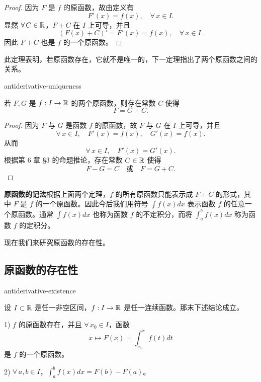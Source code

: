 \begin{proof}

	因为 \(F\) 是 \(f\) 的原函数，故由定义有
	\[
	F'(x)=f(x),\quad\forall\,x\in I.
	\]
	显然 \(\forall\,C\in\mathbb{R}\)，\(F+C\) 在 \(I\) 上可导，并且
	\[
	(F(x)+C)'=F'(x)=f(x),\quad\forall\,x\in I.
	\]
	因此 \(F+C\) 也是 \(f\) 的一个原函数。

\end{proof}

此定理表明，若原函数存在，它就不是唯一的，下一定理指出了两个原函数之间的关系。

\begin{mythm}{}{antiderivative-uniqueness}

	若 \(F,G\) 是 \(f:I\to\mathbb{R}\) 的两个原函数，则存在常数 \(C\) 使得
	\[
	F=G+C.
	\]

\end{mythm}

\begin{proof}

	因为 \(F\) 与 \(G\) 是函数 \(f\) 的原函数，故 \(F\) 与 \(G\) 在 \(I\) 上可导，并且
	\[
	\forall\,x\in I,\quad F'(x)=f(x),\quad G'(x)=f(x).
	\]
	从而
	\[
	\forall\,x\in I,\quad F'(x)=G'(x).
	\]
	根据第 6 章 §3 的命题推论，存在常数 \(C\in\mathbb{R}\) 使得
	\[
	F-G=C\quad\text{或}\quad F=G+C.
	\]

\end{proof}

\textbf{原函数的记法}\quad 根据上面两个定理，\(f\) 的所有原函数只能表示成 \(F+C\) 的形式，其中 \(F\) 是 \(f\) 的一个原函数。因此今后我们用符号 \(\displaystyle\int f(x)dx\) 表示函数 \(f\) 的任意一个原函数。通常 \(\displaystyle\int f(x)dx\) 也称为函数 \(f\) 的不定积分，而将 \(\displaystyle\int_a^b f(x)dx\) 称为函数 \(f\) 的定积分。

现在我们来研究原函数的存在性。

\subsection{原函数的存在性}
	\label{sec:7-1-3}

\begin{mythm}{}{antiderivative-existence}

	设 \(I\subset\mathbb{R}\) 是任一非空区间，\(f:I\to\mathbb{R}\) 是任一连续函数。那末下述结论成立。

	1) \(f\) 的原函数存在，并且 \(\forall\,x_0\in I\)，函数
	\[
	x\longmapsto F(x)=\int_{x_0}^x f(t)dt
	\]
	是 \(f\) 的一个原函数。

	2) \(\forall\,a,b\in I\)，\(\displaystyle\int_a^b f(x)dx=F(b)-F(a)\)。

\end{mythm}

